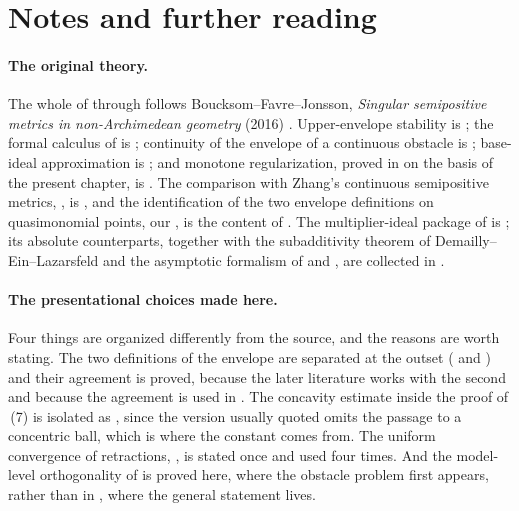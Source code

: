 \section*{Notes and further reading}

\enlargethispage{6\baselineskip}

\paragraph{The original theory.}
The whole of  through
 follows
Boucksom--Favre--Jonsson, \emph{Singular semipositive metrics in
non-Archimedean geometry} (2016) \cite{BFJ16}.  Upper-envelope stability is
\cite[Theorem~7.11]{BFJ16}; the formal calculus of
 is \cite[Proposition~8.2]{BFJ16};
continuity of the envelope of a continuous obstacle is
\cite[Theorem~8.3]{BFJ16}; base-ideal approximation is
\cite[Theorem~8.5]{BFJ16}; and monotone regularization, proved in
 on the basis of the present chapter, is
\cite[Theorem~8.7]{BFJ16}.  The comparison with Zhang's continuous
semipositive metrics, , is
\cite[Corollary~8.8]{BFJ16}, and the identification of the two envelope
definitions on quasimonomial points, our
, is the content of
\cite[Lemma~8.4 and Lemma~8.9]{BFJ16}.  The multiplier-ideal package of
 is
\cite[Appendix~B, in particular Theorem~B.8 and Remark~B.9]{BFJ16}; its
absolute counterparts, together with the subadditivity theorem of
Demailly--Ein--Lazarsfeld \cite{DEL00} and the asymptotic formalism of
\cite{PAG2} and \cite{JM12}, are collected in .

\paragraph{The presentational choices made here.}
Four things are organized differently from the source, and the reasons are
worth stating.  The two definitions of the envelope are separated at the
outset ( and ) and
their agreement is proved, because the later literature works with the
second and because the agreement is used in
.  The concavity estimate inside the proof of
\,(7) is isolated as
, since the version usually quoted omits
the passage to a concentric ball, which is where the constant comes from.
The uniform convergence of retractions,
, is stated once and used four times.  And
the model-level orthogonality of
 is proved here, where the obstacle
problem first appears, rather than in
, where the general statement lives.

